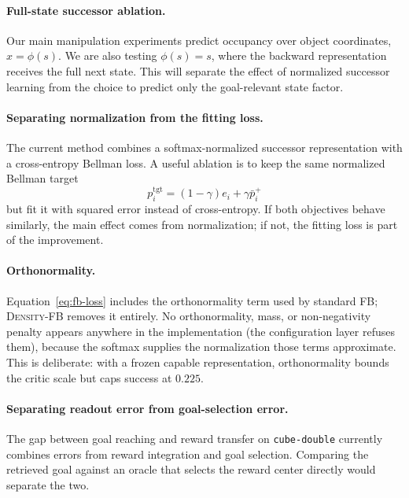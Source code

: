 \documentclass{article}
\newcommand{\DensityFB}{\textsc{Density-FB}}
\begin{document}
\paragraph{Full-state successor ablation.}
Our main manipulation experiments predict occupancy over object coordinates, $x=\phi(s)$.
We are also testing $\phi(s)=s$, where the backward representation receives the full next state.
This will separate the effect of normalized successor learning from the choice to predict only the goal-relevant state factor.

\paragraph{Separating normalization from the fitting loss.}
The current method combines a softmax-normalized successor representation with a cross-entropy Bellman loss.
A useful ablation is to keep the same normalized Bellman target
\begin{equation}
p_i^{\mathrm{tgt}}
=
(1-\gamma)e_i+\gamma\bar p_i^+
\end{equation}
but fit it with squared error instead of cross-entropy.
If both objectives behave similarly, the main effect comes from normalization; if not, the fitting loss is part of the improvement.

\paragraph{Orthonormality.}
Equation~\ref{eq:fb-loss} includes the orthonormality term used by standard FB; \DensityFB{} removes it entirely.
No orthonormality, mass, or non-negativity penalty appears anywhere in the implementation (the configuration layer refuses them), because the softmax supplies the normalization those terms approximate.
This is deliberate: with a frozen capable representation, orthonormality bounds the critic scale but caps success at $0.225$.

\paragraph{Separating readout error from goal-selection error.}
The gap between goal reaching and reward transfer on \texttt{cube-double} currently combines errors from reward integration and goal selection.
Comparing the retrieved goal against an oracle that selects the reward center directly would separate the two.



\end{document}
